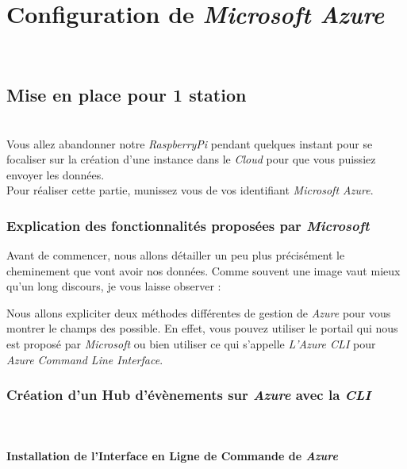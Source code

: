 \chapter{Configuration de \textit{Microsoft Azure}}\\

\section{Mise en place pour 1 station}\\

Vous allez abandonner notre \textit{RaspberryPi} pendant quelques instant pour se focaliser sur la création d'une instance dans le \textit{Cloud} pour que vous puissiez envoyer les données.\\

Pour réaliser cette partie, munissez vous de vos identifiant \textit{Microsoft Azure}.\\

\subsection{Explication des fonctionnalités proposées par \textit{Microsoft}}
Avant de commencer, nous allons détailler un peu plus précisément le cheminement que vont avoir nos données. Comme souvent une image vaut mieux qu'un long discours, je vous laisse observer : 


Nous allons expliciter deux méthodes différentes de gestion de \textit{Azure} pour vous montrer le champs des possible. En effet, vous pouvez utiliser le portail qui nous est proposé par \textit{Microsoft} ou bien utiliser ce qui s'appelle \textit{L'Azure CLI} pour \textit{Azure Command Line Interface}.

\subsection{Création d'un Hub d'évènements sur \textit{Azure} avec la \textit{CLI}}\\

\subsubsection{Installation de l'Interface en Ligne de Commande de \textit{Azure}}\\


